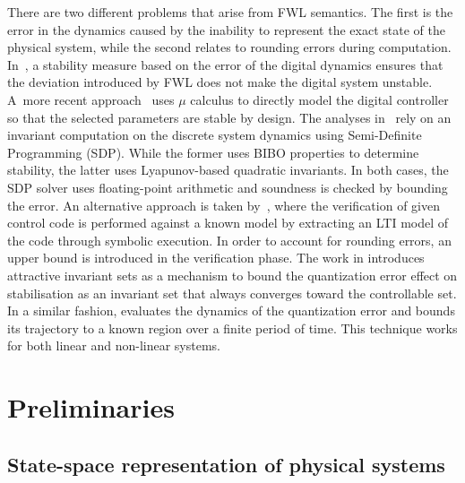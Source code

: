 \documentclass[runningheads,a4paper]{llncs}
\newcommand{\addtodo}[1]{{\color{red} TODO: #1}}
\begin{document}
There are two different problems that arise from FWL semantics.  The first
is the error in the dynamics caused by the inability to represent the exact
state of the physical system, while the second relates to rounding errors
during computation.  In~\cite{fialho1994stability}, a stability measure
based on the error of the digital dynamics ensures that the deviation
introduced by FWL does not make the digital system unstable.  A~more recent
approach~\cite{DBLP:journals/automatica/WuLCC09} uses $\mu$ calculus to
directly model the digital controller so that the selected parameters are
stable by design.  The analyses in~\cite{DBLP:conf/hybrid/RouxJG15,
DBLP:conf/hybrid/WangGRJF16} rely on an invariant computation on the
discrete system dynamics using Semi-Definite Programming (SDP).  While the
former uses BIBO properties to determine stability, the latter uses
Lyapunov-based quadratic invariants.  In both cases, the SDP solver uses
floating-point arithmetic and soundness is checked by bounding the error. 
An alternative approach is taken by~\cite{park2016scalable}, where the
verification of given control code is performed against a known model by
extracting an LTI model of the code through symbolic execution.  In order to
account for rounding errors, an upper bound is introduced in the
verification phase.  The work in \cite{picasso2003stabilization,
picasso2002construction} introduces attractive invariant sets as a mechanism
to bound the quantization error effect on stabilisation as an invariant set
that always converges toward the controllable set.  In a similar fashion,
\cite{liberzon2003hybrid} evaluates the dynamics of the quantization error
and bounds its trajectory to a known region over a finite period of time. 
This technique works for both linear and non-linear systems.


\section{Preliminaries}
\label{sec:preliminaries}

\subsection{State-space representation of physical systems} 
\label{ssec:ssrepresentation}
\end{document}
